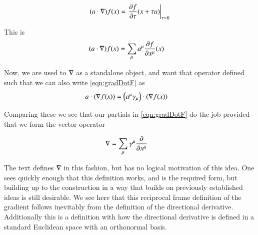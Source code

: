 \documentclass{article}
\begin{document}
\begin{align*}
(a \cdot \grad) f(x) 
&=
\left. \PD{\tau}{f}(x + \tau a) \right\vert_{\tau=0} \\
\end{align*}

This is
\begin{align}\label{eqn:gradDotF}
(a \cdot \grad) f(x) &= \sum_\mu a^\mu \PD{x^\mu}{f}(x) 
\end{align}

Now, we are used to $\grad$ as a standalone object, and want that operator defined such that we can also write \ref{eqn:gradDotF}
as
\begin{align*}
a \cdot (\grad f(x))
&=
\left(a^\mu \gamma_\mu \right) \cdot (\grad f(x))
\end{align*}

Comparing these we see that our partials in \ref{eqn:gradDotF} do the job provided that we form the vector operator

\begin{align}
\grad &= \sum_\mu \gamma^\mu \PD{x^\mu}{}
\end{align}

The text \cite{doran2003gap} defines $\grad$ in this fashion, but has no logical motivation of this idea.  One sees
quickly enough that this definition works, and is the required form, but building up to the construction
in a way that builds on previously established ideas is still desirable.
We see here that this reciprocal frame definition of the gradient follows inevitably from the definition
of the directional derivative.  Additionally this is a definition with how 
the directional derivative is defined in a standard Euclidean space with an orthonormal basis.



\end{document}

